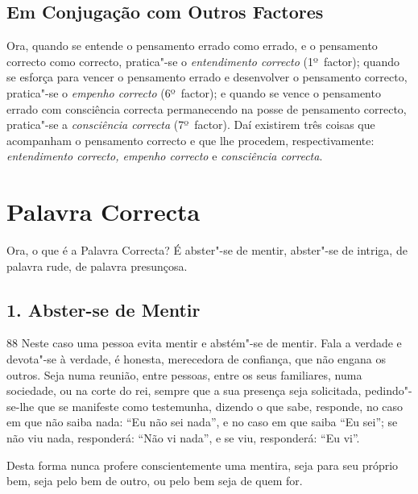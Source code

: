 
\subsection{Em Conjugação com Outros Factores}

Ora, quando se entende o pensamento errado como errado, e o pensamento correcto
como correcto, pratica"-se o \emph{entendimento correcto} (1º~factor); quando se
esforça para vencer o pensamento errado e desenvolver o pensamento correcto,
pratica"-se o \emph{empenho correcto} (6º~factor); e quando se vence o pensamento
errado com consciência correcta permanecendo na posse de pensamento correcto,
pratica"-se a \emph{consciência correcta} (7º~factor). Daí existirem três coisas
que acompanham o pensamento correcto e que lhe procedem, respectivamente:
\emph{entendimento correcto, empenho correcto} e \emph{consciência correcta}.


\clearpage

\section{Palavra Correcta}



Ora, o que é a Palavra Correcta? É abster"-se de mentir, abster"-se de intriga, de
palavra rude, de palavra presunçosa.


\subsection{1. Abster-se de Mentir}

88 Neste caso uma pessoa evita mentir e abstém"-se de mentir. Fala a verdade e
devota"-se à verdade, é honesta, merecedora de confiança, que não engana os
outros. Seja numa reunião, entre pessoas, entre os seus familiares, numa
sociedade, ou na corte do rei, sempre que a sua presença seja solicitada,
pedindo"-se-lhe que se manifeste como testemunha, dizendo o que sabe, responde,
no caso em que não saiba nada: “Eu não sei nada”, e no caso em que saiba “Eu
sei”; se não viu nada, responderá: “Não vi nada”, e se viu, responderá: “Eu
vi”.

Desta forma nunca profere conscientemente uma mentira, seja para seu próprio
bem, seja pelo bem de outro, ou pelo bem seja de quem for.

